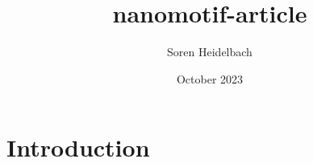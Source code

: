 \documentclass{article}
\title{nanomotif-article}
\author{Soren Heidelbach}
\date{October 2023}
\begin{document}
\maketitle

\section{Introduction}
\end{document}
